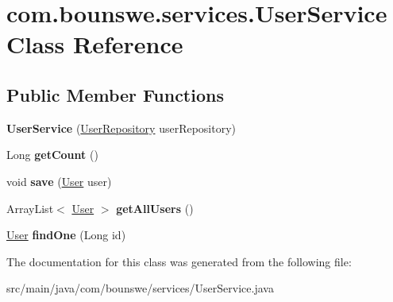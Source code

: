 \hypertarget{classcom_1_1bounswe_1_1services_1_1_user_service}{}\section{com.\+bounswe.\+services.\+User\+Service Class Reference}
\label{classcom_1_1bounswe_1_1services_1_1_user_service}
\subsection*{Public Member Functions}
\begin{DoxyCompactItemize}
\item 
\mbox{\label{classcom_1_1bounswe_1_1services_1_1_user_service_a442d2bb6eec419c795c866ae7c7859c8}} 
{\bfseries User\+Service} (\hyperlink{interfacecom_1_1bounswe_1_1repository_1_1_user_repository}{User\+Repository} user\+Repository)
\item 
\mbox{\label{classcom_1_1bounswe_1_1services_1_1_user_service_aeb0c4e4678b50515afa4a5596999cb4f}} 
Long {\bfseries get\+Count} ()
\item 
\mbox{\label{classcom_1_1bounswe_1_1services_1_1_user_service_aa8580f6a3527fccfd1a47f1aa96f9823}} 
void {\bfseries save} (\hyperlink{classcom_1_1bounswe_1_1models_1_1_user}{User} user)
\item 
\mbox{\label{classcom_1_1bounswe_1_1services_1_1_user_service_ae9c773a0a598946761cd6bab703120d1}} 
Array\+List$<$ \hyperlink{classcom_1_1bounswe_1_1models_1_1_user}{User} $>$ {\bfseries get\+All\+Users} ()
\item 
\mbox{\label{classcom_1_1bounswe_1_1services_1_1_user_service_aefc3b6add70bd0b44113634b1be9fb3d}} 
\hyperlink{classcom_1_1bounswe_1_1models_1_1_user}{User} {\bfseries find\+One} (Long id)
\end{DoxyCompactItemize}


The documentation for this class was generated from the following file\+:\begin{DoxyCompactItemize}
\item 
src/main/java/com/bounswe/services/User\+Service.\+java\end{DoxyCompactItemize}
